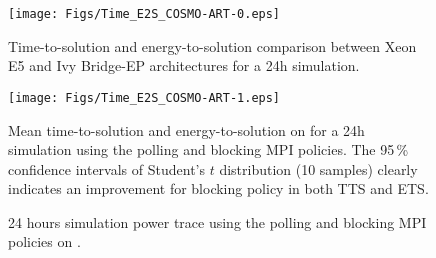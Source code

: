 \begin{figure}[htbf]
  \centering
  \texttt{[image: Figs/Time\_E2S\_COSMO-ART-0.eps]}
  \caption{Time-to-solution and  energy-to-solution comparison between
    Xeon E5 and Ivy Bridge-EP architectures for a 24h simulation.}
  \label{fig:3}
\end{figure}

\begin{figure}[htbf]
  \centering
  \texttt{[image: Figs/Time\_E2S\_COSMO-ART-1.eps]}
  \vspace{-1cm}
  \caption{Mean time-to-solution and  energy-to-solution on \tinto for
    a 24h simulation using the  polling and blocking MPI policies. The
    95\,\%  confidence  intervals of  Student's  $t$ distribution  (10
    samples) clearly  indicates an improvement for  blocking policy in
    both TTS and ETS.}
  \label{fig:4}
\end{figure}

\begin{figure*}[ht]
  \centering
  \hspace{0.8cm} \scalebox{0.62}{}
  \caption{24  hours  simulation power  trace  using  the polling  and
    blocking MPI policies on \tinto.}
  \label{fig:5}
\end{figure*}

